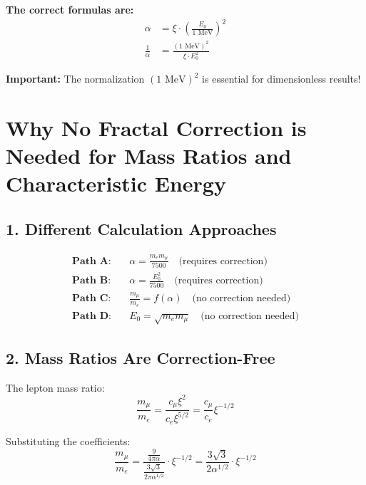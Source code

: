 \documentclass[12pt,a4paper]{article}
\theoremstyle{definition}
\begin{document}
	
	\begin{tcolorbox}[colback=blue!5!white,colframe=blue!75!black]
		\textbf{The correct formulas are:}
		\begin{align*}
			\alpha &= \xi \cdot \left(\frac{E_0}{1 \text{ MeV}}\right)^2 \\
			\frac{1}{\alpha} &= \frac{(1 \text{ MeV})^2}{\xi \cdot E_0^2}
		\end{align*}
	\end{tcolorbox}
	
	\begin{tcolorbox}[colback=red!5!white,colframe=red!75!black]
		\textbf{Important:} The normalization $(1 \text{ MeV})^2$ is essential for dimensionless results!
	\end{tcolorbox}


\section*{Why No Fractal Correction is Needed for Mass Ratios and Characteristic Energy}

\subsection*{1. Different Calculation Approaches}

\begin{align*}
	\textbf{Path A:} &\quad \alpha = \frac{m_e m_\mu}{7500} \quad \text{(requires correction)} \\
	\textbf{Path B:} &\quad \alpha = \frac{E_0^2}{7500} \quad \text{(requires correction)} \\
	\textbf{Path C:} &\quad \frac{m_\mu}{m_e} = f(\alpha) \quad \text{(no correction needed)} \\
	\textbf{Path D:} &\quad E_0 = \sqrt{m_e m_\mu} \quad \text{(no correction needed)}
\end{align*}

\subsection*{2. Mass Ratios Are Correction-Free}

The lepton mass ratio:
\[
\frac{m_\mu}{m_e} = \frac{c_\mu \xi^2}{c_e \xi^{5/2}} = \frac{c_\mu}{c_e} \xi^{-1/2}
\]

Substituting the coefficients:
\[
\frac{m_\mu}{m_e} = \frac{\frac{9}{4\pi\alpha}}{\frac{3\sqrt{3}}{2\pi\alpha^{1/2}}} \cdot \xi^{-1/2} = \frac{3\sqrt{3}}{2\alpha^{1/2}} \cdot \xi^{-1/2}
\]
\end{document}
